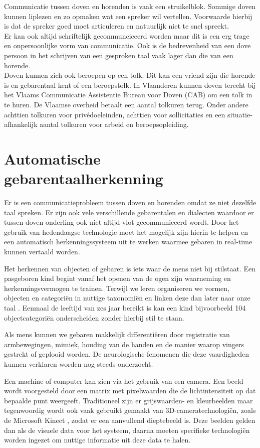\npar Communicatie tussen doven en horenden is vaak een struikelblok. Sommige doven kunnen liplezen en zo opmaken wat een spreker wil vertellen. Voorwaarde hierbij is dat de spreker goed moet articuleren en natuurlijk niet te snel spreekt.
\\ Er kan ook altijd schriftelijk gecommunciceerd worden maar dit is een erg trage en onpersoonlijke vorm van communicatie. Ook is de bedrevenheid van een dove persoon in het schrijven van een gesproken taal vaak lager dan die van een horende.
\\ Doven kunnen zich ook beroepen op een tolk. Dit kan een vriend zijn die horende is en gebarentaal kent of een beroepstolk. In Vlaanderen kunnen doven terecht bij het Vlaams Communicatie Assistentie Bureau voor Doven (CAB) om een tolk in te huren. De Vlaamse overheid betaalt een aantal tolkuren terug. Onder andere achttien tolkuren voor priv\'edoeleinden, achttien voor sollicitaties en een situatie-afhankelijk aantal tolkuren voor arbeid en beroepsopleiding.
 
\section{Automatische gebarentaalherkenning}
Er is een communicatieprobleem tussen doven en horenden omdat ze niet dezelfde taal spreken. Er zijn ook vele verschillende gebarentalen en dialecten waardoor er tussen doven onderling ook niet altijd vlot gecommuniceerd wordt.
Door het gebruik van hedendaagse technologie moet het mogelijk zijn hierin te helpen en een automatisch herkenningssysteem uit te werken waarmee gebaren in real-time kunnen vertaald worden.

\npar Het herkennen van objecten of gebaren is iets waar de mens niet bij stilstaat. Een pasgeboren kind begint vanaf het openen van de ogen zijn waarneming en herkenningsvermogen te trainen. Terwijl we leren organiseren we vormen, objecten en categori\"en in nuttige taxonomi\"en en linken deze dan later naar onze taal \cite{oneshot-object-cat}. Eenmaal de leeftijd van zes jaar bereikt is kan een kind bijvoorbeeld 104 objectcategori\"en onderscheiden zonder hierbij stil te staan.

\npar Als mens kunnen we gebaren makkelijk differenti\"eren door registratie van armbewegingen, mimiek, houding van de handen en de manier waarop vingers gestrekt of geplooid worden. De neurologische fenomenen die deze vaardigheden kunnen verklaren worden nog steeds onderzocht. 

\npar Een machine of computer kan zien via het gebruik van een camera. Een beeld wordt voorgesteld door een matrix met pixelwaarden die de lichtintensiteit op dat bepaalde punt weergeeft. Traditioneel zijn er grijswaarden- en kleurbeelden maar tegenwoordig wordt ook vaak gebruikt gemaakt van 3D-cameratechnologi\"en, zoals de Microsoft Kinect \cite{kuhn2011kinect}, zodat er een aanvullend dieptebeeld is. Deze beelden gelden dan als de visuele data voor het systeem, daarna moeten specifieke technologiën worden ingezet om nuttige informatie uit deze data te halen.

